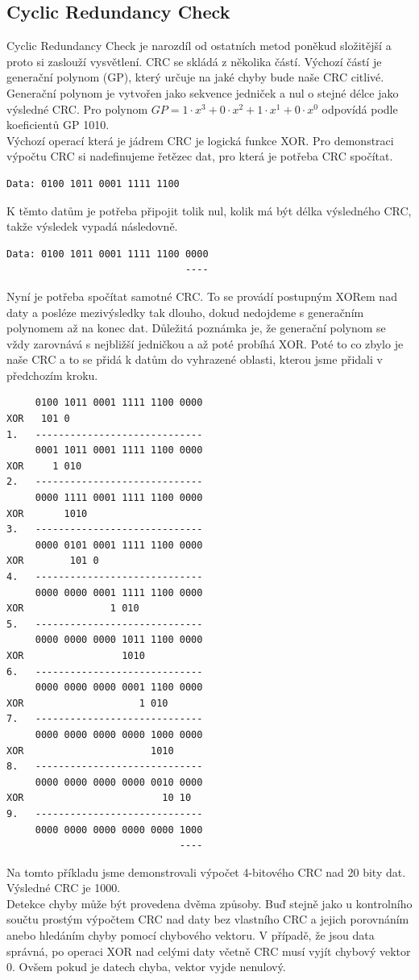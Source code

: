 \subsection{Cyclic Redundancy Check}
\label{sec:crc}
Cyclic Redundancy Check je narozdíl od ostatních metod poněkud složitější a proto si zaslouží vysvětlení. CRC se skládá z několika částí. Výchozí částí je generační polynom (GP), který určuje na jaké chyby bude naše CRC citlivé. Generační polynom je vytvořen jako sekvence jedniček a nul o stejné délce jako výsledné CRC. Pro polynom $GP=1 \cdot x^3 + 0 \cdot x^2 + 1 \cdot x^1 + 0 \cdot x^0$ odpovídá podle koeficientů GP 1010.\\
Výchozí operací která je jádrem CRC je logická funkce XOR. Pro demonstraci výpočtu CRC si nadefinujeme řetězec dat, pro která je potřeba CRC spočítat.
\begin{verbatim}
Data: 0100 1011 0001 1111 1100
\end{verbatim}
K těmto datům je potřeba připojit tolik nul, kolik má být délka výsledného CRC, takže výsledek vypadá následovně.
\begin{verbatim}
Data: 0100 1011 0001 1111 1100 0000
                               ----
\end{verbatim}
Nyní je potřeba spočítat samotné CRC. To se provádí postupným XORem nad daty a posléze mezivýsledky tak dlouho, dokud nedojdeme s generačním polynomem až na konec dat. Důležitá poznámka je, že generační polynom se vždy zarovnává s nejbližší jedničkou a až poté probíhá XOR. Poté to co zbylo je naše CRC a to se přidá k datům do vyhrazené oblasti, kterou jsme přidali v předchozím kroku.
\begin{verbatim}
     0100 1011 0001 1111 1100 0000
XOR   101 0
1.   -----------------------------
     0001 1011 0001 1111 1100 0000
XOR     1 010
2.   -----------------------------
     0000 1111 0001 1111 1100 0000
XOR       1010
3.   -----------------------------
     0000 0101 0001 1111 1100 0000
XOR        101 0
4.   -----------------------------
     0000 0000 0001 1111 1100 0000
XOR               1 010
5.   -----------------------------
     0000 0000 0000 1011 1100 0000
XOR                 1010 
6.   -----------------------------
     0000 0000 0000 0001 1100 0000
XOR                    1 010
7.   -----------------------------
     0000 0000 0000 0000 1000 0000
XOR                      1010
8.   -----------------------------
     0000 0000 0000 0000 0010 0000
XOR                        10 10
9.   -----------------------------
     0000 0000 0000 0000 0000 1000
                              ----
\end{verbatim}
Na tomto příkladu jsme demonstrovali výpočet 4-bitového CRC nad 20 bity dat. Výsledné CRC je 1000.\\
Detekce chyby může být provedena dvěma způsoby. Buď stejně jako u kontrolního součtu prostým výpočtem CRC nad daty bez vlastního CRC a jejich porovnáním anebo hledáním chyby pomocí chybového vektoru. V případě, že jsou data správná, po operaci XOR nad celými daty včetně CRC musí vyjít chybový vektor 0. Ovšem pokud je datech chyba, vektor vyjde nenulový.

